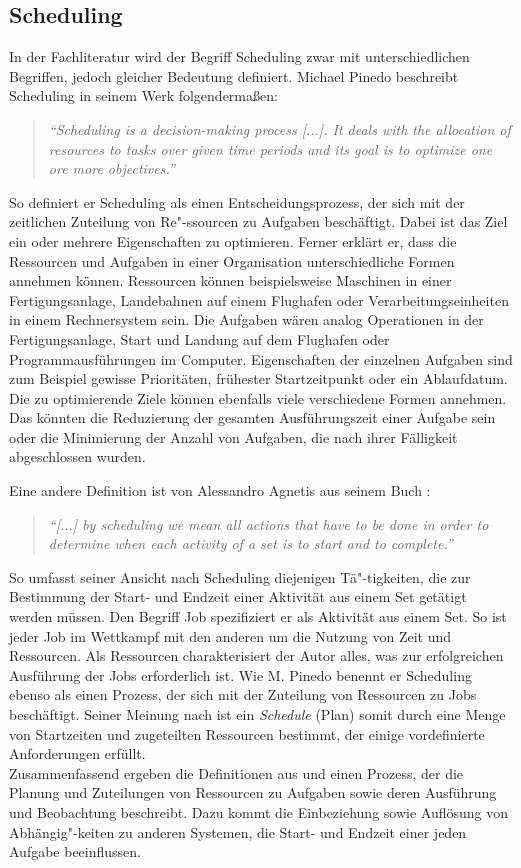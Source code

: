 \subsection{Scheduling}\label{s:scheduling}
In der Fachliteratur wird der Begriff Scheduling zwar mit unterschiedlichen Begriffen, jedoch gleicher Bedeutung definiert. Michael Pinedo beschreibt Scheduling in seinem Werk \cite{mpinedo} folgendermaßen:
\begin{quote}
\textit{"`Scheduling is a decision-making process [...]. It deals with the allocation of resources to tasks over given time periods and its goal is to optimize one ore more objectives."'}
\end{quote}
So definiert er Scheduling als einen Entscheidungsprozess, der sich mit der zeitlichen Zuteilung von Re"-ssourcen zu Aufgaben beschäftigt. Dabei ist das Ziel ein oder mehrere Eigenschaften zu optimieren. Ferner erklärt er, dass die Ressourcen und Aufgaben in einer Organisation unterschiedliche Formen annehmen können. Ressourcen können beispielsweise Maschinen in einer Fertigungsanlage, Landebahnen auf einem Flughafen oder Verarbeitungseinheiten in einem Rechnersystem sein. Die Aufgaben wären analog Operationen in der Fertigungsanlage, Start und Landung auf dem Flughafen oder Programmausführungen im Computer. Eigenschaften der einzelnen Aufgaben sind zum Beispiel gewisse Prioritäten, frühester Startzeitpunkt oder ein Ablaufdatum. Die zu optimierende Ziele können ebenfalls viele verschiedene Formen annehmen. Das könnten die Reduzierung der gesamten Ausführungszeit einer Aufgabe sein oder die Minimierung der Anzahl von Aufgaben, die nach ihrer Fälligkeit abgeschlossen wurden.

Eine andere Definition ist von Alessandro Agnetis aus seinem Buch \cite{aagnetis}:
\begin{quote}
\textit{"`[...] by scheduling we mean all actions that have to be done in order to determine when each activity of a set is to start and to complete."'}
\end{quote}
So umfasst seiner Ansicht nach Scheduling diejenigen Tä"-tigkeiten, die zur Bestimmung der Start- und Endzeit einer Aktivität aus einem Set getätigt werden müssen. Den Begriff Job spezifiziert er als Aktivität aus einem Set. So ist jeder Job im Wettkampf mit den anderen um die Nutzung von Zeit und Ressourcen. Als Ressourcen charakterisiert der Autor alles, was zur erfolgreichen Ausführung der Jobs erforderlich ist. Wie M. Pinedo benennt er Scheduling ebenso als einen Prozess, der sich mit der Zuteilung von Ressourcen zu Jobs beschäftigt. Seiner Meinung nach ist ein \textit{Schedule} (Plan) somit durch eine Menge von Startzeiten und zugeteilten Ressourcen bestimmt, der einige vordefinierte Anforderungen erfüllt.\\
Zusammenfassend ergeben die Definitionen aus \cite{mpinedo} und \cite{aagnetis} einen Prozess, der die Planung und Zuteilungen von Ressourcen zu Aufgaben sowie deren Ausführung und Beobachtung beschreibt. Dazu kommt die Einbeziehung sowie Auflösung von Abhängig"-keiten zu anderen Systemen, die Start- und Endzeit einer jeden Aufgabe beeinflussen.

